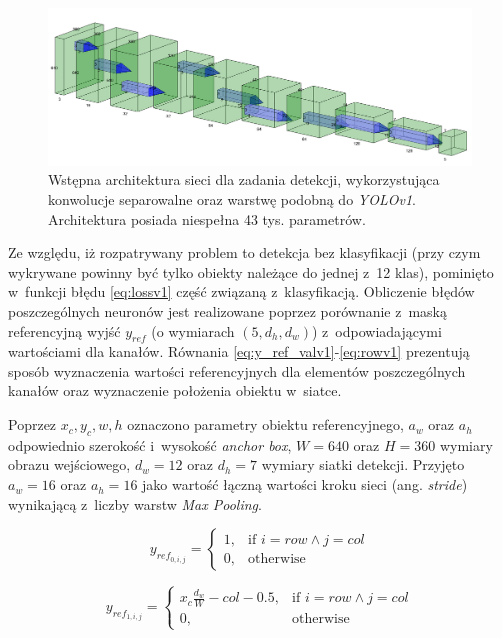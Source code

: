 \begin{figure}
    \centering
    \includegraphics[width=\linewidth]{images/arch_v1.png}
    \caption{Wstępna architektura sieci dla zadania detekcji, wykorzystująca konwolucje separowalne oraz warstwę podobną do \emph{YOLOv1}. Architektura posiada niespełna 43 tys. parametrów.}
    \label{fig:arch_v1}
\end{figure}

Ze względu, iż rozpatrywany problem to detekcja bez klasyfikacji (przy czym wykrywane powinny być tylko obiekty należące do jednej z~12 klas), pominięto w~funkcji błędu \eqref{eq:lossv1} część związaną z~klasyfikacją. 
Obliczenie błędów poszczególnych neuronów jest realizowane poprzez porównanie z~maską referencyjną wyjść $y_{ref}$ (o wymiarach $(5,d_h,d_w)$) z~odpowiadającymi wartościami dla kanałów. 
Równania \eqref{eq:y_ref_valv1}-\eqref{eq:rowv1} prezentują sposób wyznaczenia wartości referencyjnych dla elementów poszczególnych kanałów oraz wyznaczenie położenia obiektu w~siatce.

Poprzez $x_c, y_c, w, h$ oznaczono parametry obiektu referencyjnego, $a_w$ oraz $a_h$  odpowiednio szerokość i~wysokość \emph{anchor box}, $W = 640$ oraz $H = 360$ wymiary obrazu wejściowego, $d_w = 12$ oraz $d_h = 7$ wymiary siatki detekcji. 
Przyjęto  $a_w = 16$ oraz $a_h = 16$ jako wartość łączną wartości kroku sieci (ang. \emph{stride}) wynikającą z~liczby warstw \emph{Max Pooling}.

\begin{equation}
y_{ref}_{0,i,j} = 
\begin{cases}
    1, & \text{if }  i = row \land j = col \\
    0,              & \text{otherwise}
\end{cases}
\label{eq:y_ref_valv1}
\end{equation}

\begin{equation}
y_{ref}_{1,i,j} = 
\begin{cases}
    x_c \frac{d_w}{W} - col - 0.5, & \text{if }  i = row \land j = col \\
    0,              & \text{otherwise}
\end{cases}
\label{eq:y_ref_xv1}
\end{equation}

